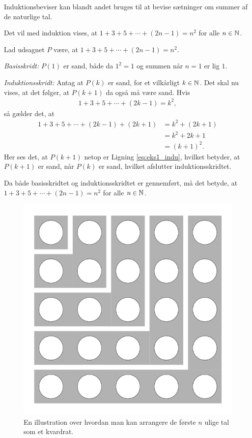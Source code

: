 Induktionsbeviser kan blandt andet bruges til at bevise sætninger om summer af de naturlige tal.
\begin{exmp}
	Det vil med induktion vises, at $1 + 3 + 5 + \dotsb + (2n-1) = n^2$ for alle $n \in \mathbb{N}$.

	Lad udsagnet $P$ være, at $1 + 3 + 5 + \dotsb + (2n-1) = n^2$.
	
	\textit{Basisskridt:} $P(1)$ er sand, både da $1^2 = 1$ og summen når $n = 1$ er lig $1$.

	\textit{Induktionsskridt:} Antag at $P(k)$ er sand, for et vilkårligt $k \in \mathbb{N}$.
	Det skal nu vises, at det følger, at $P(k + 1)$ da også må være sand. 
	Hvis
	\begin{align}
		1 + 3 + 5 + \dotsb + (2k-1) 
		= k^2, \nonumber
	\end{align}
	så gælder det, at
	\begin{align}
		1 + 3 + 5 + \dotsb + (2k-1) + (2k+1) 
		&= k^2 + (2k + 1) \nonumber \\
		&= k^2 + 2k + 1 \nonumber \\
		&= \left( k + 1 \right) ^2. \label{eq:eks1_indu}
	\end{align}
	Her ses det, at $P(k + 1)$ netop er Ligning \eqref{eq:eks1_indu}, hvilket betyder, at $P(k + 1)$ er sand, når $P(k)$ er sand, hvilket afslutter induktionsskridtet.

	Da både basisskridtet og induktionsskridtet er gennemført, må det betyde, at $1 + 3 + 5 + \dotsb + (2n-1) = n^2$ for alle $n \in \mathbb{N}$.
\end{exmp}

\begin{figure}
	\centering
	\includegraphics[scale=0.21]{fig/img/sum_of_n_first_odd_integers.png}
	\caption{En illustration over hvordan man kan arrangere de første $n$ ulige tal som et kvardrat.} \label{fig1_indu}
\end{figure}

